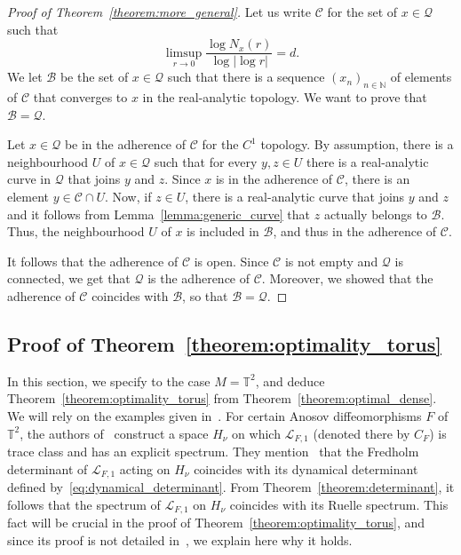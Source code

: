 \documentclass[AHL,Unicode,longabstracts,published]{cedram}
\newcommand{\clL}{\mathcal{L}}
\newcommand{\clB}{\mathcal{B}}
\newcommand{\clQ}{\mathcal{Q}}
\newcommand{\clC}{\mathcal{C}}
\newcommand{\bbT}{\mathbb{T}}
\newcommand{\bbN}{\mathbb{N}}
\begin{document}
\begin{proof}[Proof of Theorem~\ref{theorem:more_general}]
Let us write $\clC$ for the set of $x \in \clQ$ such that
\begin{equation*}
\limsup_{r \to 0} \frac{\log N_{x}(r)}{\log |\log r|} = d.
\end{equation*}
We let $\clB$ be the set of $x \in \clQ$ such that there is a sequence $(x_n)_{n \in \bbN}$ of elements of $\clC$ that converges to $x$ in the real-analytic topology. We want to prove that $\clB = \clQ$.

Let $x \in \clQ$ be in the adherence of $\clC$ for the $C^1$ topology. By assumption, there is a neighbourhood $U$ of $x \in \clQ$ such that for every $y,z \in U$ there is a real-analytic curve in $\clQ$ that joins $y$ and $z$. Since $x$ is in the adherence of $\clC$, there is an element $y \in \clC \cap U$. Now, if $z \in U$, there is a real-analytic curve that joins $y$ and $z$ and it follows from Lemma~\ref{lemma:generic_curve} that $z$ actually belongs to $\clB$. Thus, the neighbourhood $U$ of $x$ is included in $\clB$, and thus in the adherence of $\clC$.

It follows that the adherence of $\clC$ is open. Since $\clC$ is not empty and $\clQ$ is connected, we get that $\clQ$ is the adherence of $\clC$. Moreover, we showed that the adherence of $\clC$ coincides with $\clB$, so that $\clB = \clQ$.
\end{proof}

\subsection{Proof of Theorem~\ref{theorem:optimality_torus}}\label{subsection:optimality_torus}

In this section, we specify to the case $M = \bbT^2$, and deduce Theorem~\ref{theorem:optimality_torus} from Theorem~\ref{theorem:optimal_dense}. We will rely on the examples given in~\cite{optimal_examples}. For certain Anosov diffeomorphisms $F$ of $\bbT^2$, the authors of~\cite{optimal_examples} construct a space $H_\nu$ on which $\clL_{F,1}$ (denoted there by $C_F$) is trace class and has an explicit spectrum. They mention~\cite[Remark~1.4]{optimal_examples} that the Fredholm determinant of $\clL_{F,1}$ acting on $H_\nu$ coincides with its dynamical determinant defined by~\eqref{eq:dynamical_determinant}. From Theorem~\ref{theorem:determinant}, it follows that the spectrum of $\clL_{F,1}$ on $H_\nu$ coincides with its Ruelle spectrum. This fact will be crucial in the proof of Theorem~\ref{theorem:optimality_torus}, and since its proof is not detailed in~\cite{optimal_examples}, we explain here why it holds.
\end{document}
